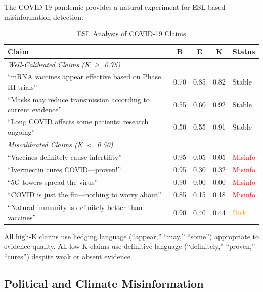 \documentclass[11pt,a4paper]{article}
\begin{document}
The COVID-19 pandemic provides a natural experiment for ESL-based misinformation detection:

\begin{table}[H]
\centering
\caption{ESL Analysis of COVID-19 Claims}
\begin{tabular}{p{5.5cm}cccl}
\toprule
\textbf{Claim} & \textbf{B} & \textbf{E} & \textbf{K} & \textbf{Status} \\
\midrule
\multicolumn{5}{l}{\textit{Well-Calibrated Claims (K $\geq$ 0.75)}} \\
``mRNA vaccines appear effective based on Phase III trials'' & 0.70 & 0.85 & 0.82 & \textcolor{green!60!black}{Stable} \\
``Masks may reduce transmission according to current evidence'' & 0.55 & 0.60 & 0.92 & \textcolor{green!60!black}{Stable} \\
``Long COVID affects some patients; research ongoing'' & 0.50 & 0.55 & 0.91 & \textcolor{green!60!black}{Stable} \\
\midrule
\multicolumn{5}{l}{\textit{Miscalibrated Claims (K $<$ 0.50)}} \\
``Vaccines definitely cause infertility'' & 0.95 & 0.05 & 0.05 & \textcolor{red}{Misinfo} \\
``Ivermectin cures COVID---proven!'' & 0.95 & 0.30 & 0.32 & \textcolor{red}{Misinfo} \\
``5G towers spread the virus'' & 0.90 & 0.00 & 0.00 & \textcolor{red}{Misinfo} \\
``COVID is just the flu---nothing to worry about'' & 0.85 & 0.15 & 0.18 & \textcolor{red}{Misinfo} \\
``Natural immunity is definitely better than vaccines'' & 0.90 & 0.40 & 0.44 & \textcolor{orange}{Risk} \\
\bottomrule
\end{tabular}
\end{table}

\begin{warningbox}[title={Key Pattern}]
All high-K claims use hedging language (``appear,'' ``may,'' ``some'') appropriate to evidence quality. All low-K claims use definitive language (``definitely,'' ``proven,'' ``cures'') despite weak or absent evidence.
\end{warningbox}

\subsection{Political and Climate Misinformation}
\end{document}
